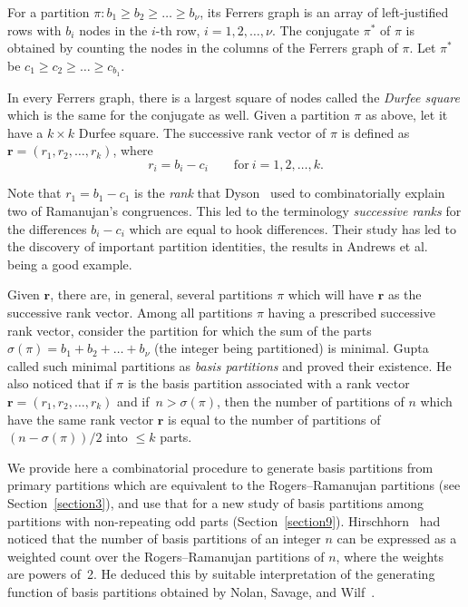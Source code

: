 \documentclass[pdftex]{sigma}
\numberwithin{equation}{section}
\theoremstyle{definition}
\begin{document}
For a partition $\pi\colon b_1\ge b_2\ge \dots \ge b_\nu$, its Ferrers graph
is an array of left-justified rows with $b_i$ nodes in the $i$-th row,
$i=1,2,\dots,\nu$.
The conjugate $\pi^*$ of $\pi$ is
obtained
by counting the nodes in the columns of the Ferrers graph of $\pi$.
Let
$\pi^*$ be $c_1\ge c_2 \ge \dots \ge c_{b_1}$.

In every Ferrers graph, there is a largest square of nodes called the
{\it Durfee square} which is the same for the conjugate as well. Given
a partition $\pi$ as above, let it have a $k\times k$ Durfee square.
The successive rank vector of $\pi$ is defined as $\mathbf{r}= (r_1, r_2, \dots ,
r_k)$, where
\begin{equation*}
r_i=b_i-c_i \qquad \text{for} \ i=1,2,\dots,k. %
\end{equation*}

Note that $r_1=b_1-c_1$ is the {\it rank} that Dyson~\cite{Dy44} used
to combinatorially explain two of Ramanujan's congruences. This led
to the terminology {\it successive ranks} for the differences $b_i-c_i$
which are equal to hook differences. Their study has led to the discovery of
important partition identities, the results in Andrews et al.~\cite{An-Ba-etal0087} being a good
example.

Given $\mathbf{r}$, there are, in general, several partitions $\pi$
which will have $\mathbf{r}$ as the successive rank vector. Among all
partitions $\pi$ having a prescribed successive rank vector, consider
the partition for which the sum of the parts $\sigma(\pi)=b_1+b_2+\dots +
b_{\nu}$ (the integer being partitioned) is minimal. Gupta~\cite{Gu0076} called
such minimal partitions as {\it basis partitions} and proved their
existence. He also noticed that if $\pi$ is the basis partition associated
with a rank vector $\mathbf{r}= (r_1, r_2, \dots , r_k)$ and if~${n>\sigma(\pi)}$, then the number
of partitions of $n$ which have the same rank vector $\mathbf{r}$ is equal to
the number of partitions of $(n-\sigma(\pi))/2$ into $\le k$ parts.

We provide here a combinatorial procedure to generate basis
partitions from primary partitions which are equivalent to the
Rogers--Ramanujan partitions (see Section~\ref{section3}), and use that for a new study
of basis
partitions among partitions with non-repeating odd parts (Section~\ref{section9}).
Hirschhorn~\cite{Hi0099} had noticed
that the number of basis partitions of an integer $n$ can be expressed
as a weighted count over the Rogers--Ramanujan partitions of $n$, where
the weights are powers of~2. He deduced this by suitable interpretation
of the generating function of basis partitions obtained by Nolan, Savage,
and Wilf~\cite{No-Sa-Wi0098}.
\end{document}
